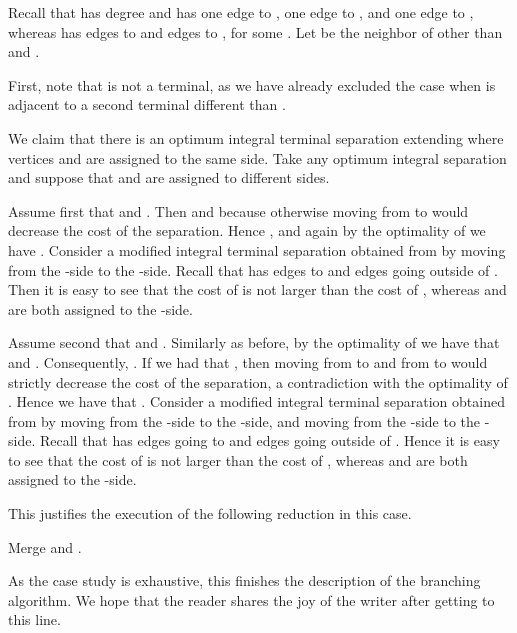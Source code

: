 Recall that  has degree  and has one edge to , one edge to , and one edge to , whereas  has  edges to  and  edges to , for some . Let  be the neighbor of  other than  and .

First, note that  is not a terminal, as we have already excluded the case 
when  is adjacent to a second terminal different than .

We claim that there is an optimum integral terminal separation  extending  where vertices  and  are assigned to the same side. Take any optimum integral separation  and suppose that  and  are assigned to different sides.

Assume first that  and . Then  and  because otherwise moving  from  to  would decrease the cost of the separation. Hence , and again by the optimality of  we have . Consider a modified integral terminal separation  obtained from  by moving  from the -side to the -side. Recall that  has  edges to  and  edges going outside of . Then it is easy to see that the cost of  is not larger than the cost of , whereas  and  are both assigned to the -side.

Assume second that  and . Similarly as before, by the optimality of  we have that  and . Consequently, . If we had that , then moving  from  to  and  from  to  would strictly decrease the cost of the separation, a contradiction with the optimality of . Hence we have that . Consider a modified integral terminal separation  obtained from  by moving  from the -side to the -side, and moving  from the -side to the -side. Recall that  has  edges going to  and  edges going outside of . Hence it is easy to see that the cost of  is not larger than the cost of , whereas  and  are both assigned to the -side.

This justifies the execution of the following reduction in this case.

\begin{reductionstep}
Merge  and .
\end{reductionstep}

As the case study is exhaustive, this finishes the description of the branching algorithm. We hope that the reader shares the joy of the writer after getting to this line.




